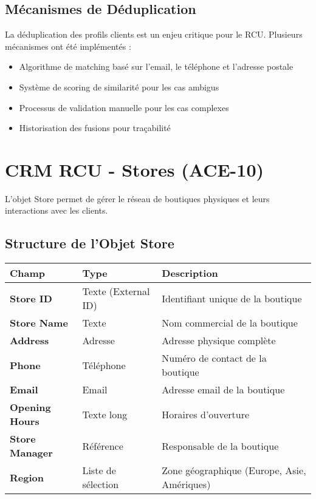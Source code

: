 \subsection{Mécanismes de Déduplication}

\begin{mdframed}[backgroundcolor=lightgreen!20, linewidth=1pt]
La déduplication des profils clients est un enjeu critique pour le RCU. Plusieurs mécanismes ont été implémentés :

\begin{itemize}
    \item Algorithme de matching basé sur l'email, le téléphone et l'adresse postale
    \item Système de scoring de similarité pour les cas ambigus
    \item Processus de validation manuelle pour les cas complexes
    \item Historisation des fusions pour traçabilité
\end{itemize}
\end{mdframed}

\section{CRM RCU - Stores (ACE-10)}

L'objet Store permet de gérer le réseau de boutiques physiques et leurs interactions avec les clients.

\subsection{Structure de l'Objet Store}

\begin{center}
\begin{tabular}{|>{\bfseries}p{4cm}|p{4cm}|p{5.5cm}|}
\hline
\rowcolor{lightblue} Champ & Type & Description \\
\hline
Store ID & Texte (External ID) & Identifiant unique de la boutique \\
\hline
Store Name & Texte & Nom commercial de la boutique \\
\hline
Address & Adresse & Adresse physique complète \\
\hline
Phone & Téléphone & Numéro de contact de la boutique \\
\hline
Email & Email & Adresse email de la boutique \\
\hline
Opening Hours & Texte long & Horaires d'ouverture \\
\hline
Store Manager & Référence & Responsable de la boutique \\
\hline
Region & Liste de sélection & Zone géographique (Europe, Asie, Amériques) \\
\hline
\end{tabular}
\end{center}


